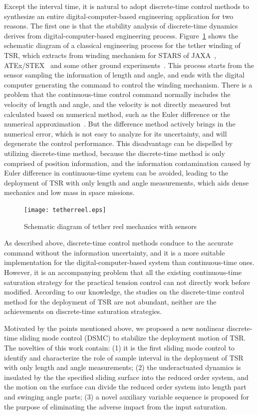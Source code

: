 \documentclass[10pt,final,journal]{IEEEtran}
\begin{document}
Except the interval time, it is natural to adopt discrete-time control methods to synthesize an entire digital-computer-based engineering application for two reasons. The first one is that the stability analysis of discrete-time dynamics derives from digital-computer-based engineering process. Figure~\ref{fig:tetherreel} shows the schematic diagram of a classical engineering process for the tether winding of TSR, which extracts from winding mechanism for STARS of JAXA~\cite{Nohmi2009}, ATEx/STEX~\cite{Gates2001} and some other ground experiments~\cite{Iki2014,Nakaya2004}. This process starts from the sensor sampling the information of length and angle, and ends with the digital computer generating the command to control the winding mechanism. There is a problem that the continuous-time control command normally includes the velocity of length and angle,  and the velocity is not directly measured but calculated based on numerical method, such as the Euler difference or the numerical approximation~\cite{Kang2018}. But the difference method actively brings in the numerical error, which is not easy to analyze for its uncertainty, and will degenerate the control performance. 
This disadvantage can be dispelled by utilizing discrete-time method, because the discrete-time method is only comprised of position information, and the information contamination caused by Euler difference in continuous-time system can be avoided, leading to the deployment of TSR with only length and angle measurements, which aids dense mechanics and low mass in space missions. 
\begin{figure}[htbp]  
	\centering
\texttt{[image: tetherreel.eps]}
\caption{Schematic diagram of tether reel mechanics with sensors} \label{fig:tetherreel}
\end{figure}  

As described above, discrete-time control methods conduce to the accurate command without the information uncertainty, and it is a more suitable implementation for the digital-computer-based system than continuous-time ones. However, it is an accompanying problem that all the existing continuous-time saturation strategy for the practical tension control can not directly work before modified. According to our knowledge, the studies on the discrete-time control method for the deployment of TSR are not abundant, neither are the achievements on discrete-time saturation strategies. 

Motivated by the points mentioned above, we proposed a new nonlinear discrete-time sliding mode control (DSMC) to stabilize the deployment motion of TSR. The novelties of this work contain: 
(1) it is the first sliding mode control to identify and characterize the role of sample interval in the deployment of TSR with only length and angle measurements; (2) the underactuated dynamics is insulated by the the specified sliding surface into the reduced order system, and the motion on the surface can divide the reduced order system into length part and swinging angle parts; (3) a novel auxiliary variable sequence is proposed for the purpose of eliminating the adverse impact from the input saturation.  
\end{document}
